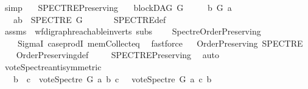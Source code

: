\begin{isabellebody}
\ simp\ \ \isanewline
{}\isamarkupfalse%
%
\endisatagproof
{\isafoldproof}%
%
\isadelimproof
\isanewline
%
\endisadelimproof
\isanewline
\isanewline
{}\isamarkupfalse%
\ SPECTRE{\isacharunderscore}{\kern0pt}Preserving{\isacharcolon}{\kern0pt}\isanewline
\ \ \ {\isachardoublequoteopen}blockDAG\ G{\isachardoublequoteclose}\isanewline
\ \ \ \ \ {\isachardoublequoteopen}b\ {\isasymrightarrow}\isactrlsup {\isacharplus}{\kern0pt}\isactrlbsub G\isactrlesub \ a{\isachardoublequoteclose}\isanewline
\ \ \ {\isachardoublequoteopen}{\isacharparenleft}{\kern0pt}a{\isacharcomma}{\kern0pt}b{\isacharparenright}{\kern0pt}\ {\isasymin}\ {\isacharparenleft}{\kern0pt}SPECTRE\ G{\isacharparenright}{\kern0pt}{\isachardoublequoteclose}\ \ \ \isanewline
%
\isadelimproof
\ \ %
\endisadelimproof
%
\isatagproof
{}\isamarkupfalse%
\ SPECTRE{\isacharunderscore}{\kern0pt}def\isanewline
\ \ \isamarkupfalse%
\ assms\ \ wf{\isacharunderscore}{\kern0pt}digraph{\isachardot}{\kern0pt}reachable{}{\isacharunderscore}{\kern0pt}in{\isacharunderscore}{\kern0pt}verts\ subs\isanewline
\ \ \ \ Spectre{\isacharunderscore}{\kern0pt}Order{\isacharunderscore}{\kern0pt}Preserving\isanewline
\ \ \ \ SigmaI\ case{\isacharunderscore}{\kern0pt}prodI\ mem{\isacharunderscore}{\kern0pt}Collect{\isacharunderscore}{\kern0pt}eq\ \isamarkupfalse%
\ fastforce%
\endisatagproof
{\isafoldproof}%
%
\isadelimproof
\ \isanewline
%
\endisadelimproof
\isanewline
{}\isamarkupfalse%
\ {\isachardoublequoteopen}Order{\isacharunderscore}{\kern0pt}Preserving\ SPECTRE{\isachardoublequoteclose}\isanewline
%
\isadelimproof
\ \ %
\endisadelimproof
%
\isatagproof
{}\isamarkupfalse%
\ Order{\isacharunderscore}{\kern0pt}Preserving{\isacharunderscore}{\kern0pt}def\ \isanewline
\ \ \isamarkupfalse%
\ SPECTRE{\isacharunderscore}{\kern0pt}Preserving\ \isamarkupfalse%
\ auto%
\endisatagproof
{\isafoldproof}%
%
\isadelimproof
\ \isanewline
%
\endisadelimproof
\isanewline
{}\isamarkupfalse%
\ vote{\isacharunderscore}{\kern0pt}Spectre{\isacharunderscore}{\kern0pt}antisymmetric{\isacharcolon}{\kern0pt}\ \isanewline
\ \ \ {\isachardoublequoteopen}b\ {\isasymnoteq}\ c\ {\isasymLongrightarrow}\ vote{\isacharunderscore}{\kern0pt}Spectre\ G\ a\ b\ c\ {\isacharequal}{\kern0pt}\ {\isacharminus}{\kern0pt}\ {\isacharparenleft}{\kern0pt}vote{\isacharunderscore}{\kern0pt}Spectre\ G\ a\ c\ b{\isacharparenright}{\kern0pt}{\isachardoublequoteclose}\isanewline

\end{isabellebody}
